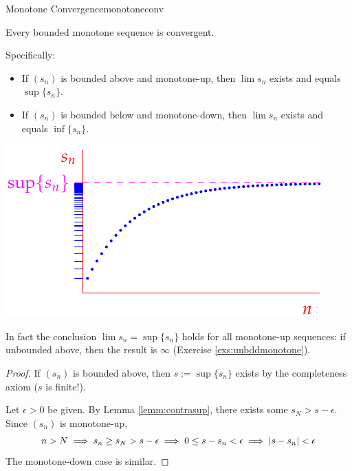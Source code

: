 \begin{thm}[lower separated=false, sidebyside, sidebyside align=top seam, sidebyside gap=0pt, righthand width=0.48\linewidth]{Monotone Convergence}{monotoneconv}\par
	Every bounded monotone sequence is convergent.\par Specifically:
	\begin{itemize}
	  \item If $(s_n)$ is bounded above and monotone-up, then $\lim s_n$ exists and equals $\sup\{s_n\}$.
	  \item If $(s_n)$ is bounded below and monotone-down, then $\lim s_n$ exists and equals $\inf\{s_n\}$.
	\end{itemize}
	\tcblower
	\flushright\includegraphics[scale=0.95]{monotone}
\end{thm}

In fact the conclusion $\lim s_n=\sup\{s_n\}$ holds for all monotone-up sequences: if unbounded above, then the result is $\infty$ (Exercise \ref{exs:unbddmonotone}).


\begin{proof}
	If $(s_n)$ is bounded above, then $s:=\sup\{s_n\}$ exists by the completeness axiom ($s$ is finite!).\par
	Let $\epsilon>0$ be given. By Lemma \ref{lemm:contrasup}, there exists some $s_N>s-\epsilon$. Since $(s_n)$ is monotone-up,
	\[
		n>N\implies s_n\ge s_N>s-\epsilon
		\implies 0\le s-s_n<\epsilon
		\implies \left| s-s_n\right|<\epsilon
	\]
	The monotone-down case is similar.
\end{proof}



